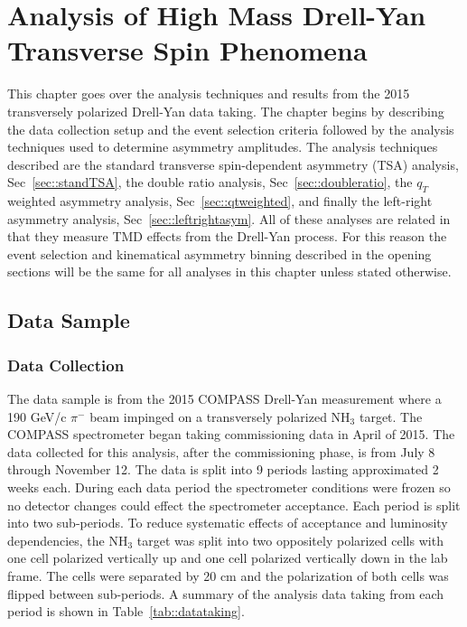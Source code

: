 \chapter{Analysis of High Mass Drell-Yan Transverse Spin Phenomena}
\label{ch::leftright}
\ifpdf
\graphicspath{{Chapters/HMAnalysis/Figs/}}
\fi

This chapter goes over the analysis techniques and results from the 2015
transversely polarized Drell-Yan data taking.  The chapter begins by describing
the data collection setup and the event selection criteria followed by the
analysis techniques used to determine asymmetry amplitudes.  The analysis
techniques described are the standard transverse spin-dependent asymmetry (TSA)
analysis, Sec~\ref{sec::standTSA}, the double ratio analysis,
Sec~\ref{sec::doubleratio}, the $q_T$ weighted asymmetry analysis,
Sec~\ref{sec::qtweighted}, and finally the left-right asymmetry analysis,
Sec~\ref{sec::leftrightasym}.  All of these analyses are related in that they
measure TMD effects from the Drell-Yan process.  For this reason the event
selection and kinematical asymmetry binning described in the opening sections
will be the same for all analyses in this chapter unless stated otherwise.

\section{Data Sample} \label{sec::datasample}

\subsection{Data Collection} \label{sec::datacollection}

The data sample is from the 2015 COMPASS Drell-Yan measurement where a 190 GeV/c
$\pi^-$ beam impinged on a transversely polarized NH$_3$ target.  The COMPASS
spectrometer began taking commissioning data in April of 2015.  The data
collected for this analysis, after the commissioning phase, is from July 8
through November 12.  The data is split into 9 periods lasting approximated 2
weeks each.  During each data period the spectrometer conditions were frozen so
no detector changes could effect the spectrometer acceptance.  Each period is
split into two sub-periods.  To reduce systematic effects of acceptance and
luminosity dependencies, the NH$_3$ target was split into two oppositely
polarized cells with one cell polarized vertically up and one cell polarized
vertically down in the lab frame.  The cells were separated by 20 cm and the
polarization of both cells was flipped between sub-periods.  A summary of the
analysis data taking from each period is shown in Table~\ref{tab::datataking}.

